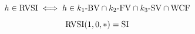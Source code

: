 \begin{frame}{}
  \begin{equation*}
    h \in \text{RVSI}{} \iff h \in k_1\text{-BV}{} \cap k_2\text{-FV}{} \cap k_3\text{-SV}{} \cap \text{WCF}{}
  \end{equation*}

  \vspace{0.50cm}
  \[
    \text{RVSI}(1,0,\ast) = \text{SI}
  \]
\end{frame}
